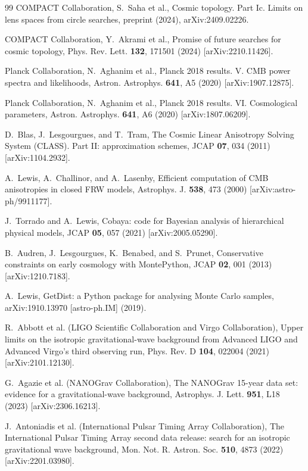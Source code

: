 \documentclass[12pt,a4paper]{article}
\begin{document}
\begin{thebibliography}{99}
COMPACT Collaboration, S.~Saha et al.,
Cosmic topology. Part Ic. Limits on lens spaces from circle searches,
preprint (2024), arXiv:2409.02226.

COMPACT Collaboration, Y.~Akrami et al.,
Promise of future searches for cosmic topology,
Phys. Rev. Lett. \textbf{132}, 171501 (2024) [arXiv:2210.11426].

Planck Collaboration, N.~Aghanim et al.,
Planck 2018 results. V. CMB power spectra and likelihoods,
Astron. Astrophys. \textbf{641}, A5 (2020) [arXiv:1907.12875].

Planck Collaboration, N.~Aghanim et al.,
Planck 2018 results. VI. Cosmological parameters,
Astron. Astrophys. \textbf{641}, A6 (2020) [arXiv:1807.06209].

D.~Blas, J.~Lesgourgues, and T.~Tram,
The Cosmic Linear Anisotropy Solving System (CLASS). Part II: approximation schemes,
JCAP \textbf{07}, 034 (2011) [arXiv:1104.2932].

A.~Lewis, A.~Challinor, and A.~Lasenby,
Efficient computation of CMB anisotropies in closed FRW models,
Astrophys. J. \textbf{538}, 473 (2000) [arXiv:astro-ph/9911177].

J.~Torrado and A.~Lewis,
Cobaya: code for Bayesian analysis of hierarchical physical models,
JCAP \textbf{05}, 057 (2021) [arXiv:2005.05290].

B.~Audren, J.~Lesgourgues, K.~Benabed, and S.~Prunet,
Conservative constraints on early cosmology with MontePython,
JCAP \textbf{02}, 001 (2013) [arXiv:1210.7183].

A.~Lewis,
GetDist: a Python package for analysing Monte Carlo samples,
arXiv:1910.13970 [astro-ph.IM] (2019).

R.~Abbott et al. (LIGO Scientific Collaboration and Virgo Collaboration),
Upper limits on the isotropic gravitational-wave background from Advanced LIGO and Advanced Virgo's third observing run,
Phys. Rev. D \textbf{104}, 022004 (2021) [arXiv:2101.12130].

G.~Agazie et al. (NANOGrav Collaboration),
The NANOGrav 15-year data set: evidence for a gravitational-wave background,
Astrophys. J. Lett. \textbf{951}, L18 (2023) [arXiv:2306.16213].

J.~Antoniadis et al. (International Pulsar Timing Array Collaboration),
The International Pulsar Timing Array second data release: search for an isotropic gravitational wave background,
Mon. Not. R. Astron. Soc. \textbf{510}, 4873 (2022) [arXiv:2201.03980].


\end{thebibliography}
\end{document}
